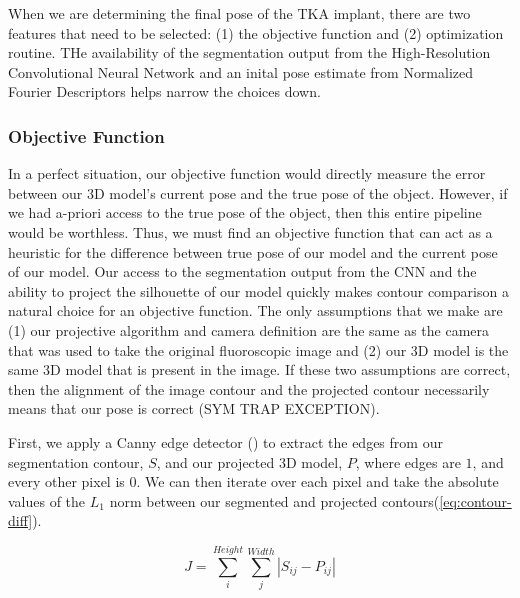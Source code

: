 
When we are determining the final pose of the TKA implant, there are two features that need to be selected: (1) the objective function and (2) optimization routine. THe availability of the segmentation output from the High-Resolution Convolutional Neural Network and an inital pose estimate from Normalized Fourier Descriptors helps narrow the choices down.

\subsubsection{Objective Function}
In a perfect situation, our objective function would directly measure the error between our 3D model's current pose and the true pose of the object. However, if we had a-priori access to the true pose of the object, then this entire pipeline would be worthless. Thus, we must find an objective function that can act as a heuristic for the difference between true pose of our model and the current pose of our model. Our access to the segmentation output from the CNN and the ability to project the silhouette of our model quickly makes contour comparison a natural choice for an objective function. The only assumptions that we make are (1) our projective algorithm and camera definition are the same as the camera that was used to take the original fluoroscopic image and (2) our 3D model is the same 3D model that is present in the image. If these two assumptions are correct, then the alignment of the image contour and the projected contour necessarily means that our pose is correct (SYM TRAP EXCEPTION).

First, we apply a Canny edge detector (\cite{cannyComputationalApproachEdge1986}) to extract the edges from our segmentation contour, $S$, and our projected 3D model, $P$, where edges are $1$, and every other pixel is $0$. We can then iterate over each pixel and take the absolute values of the $L_1$ norm between our segmented and projected contours(\cref{eq:contour-diff}).

\begin{equation}
    J = \sum_i^{Height}\sum_j^{Width}|S_{ij} - P_{ij}|
    \label{eq:contour-diff}
\end{equation}


